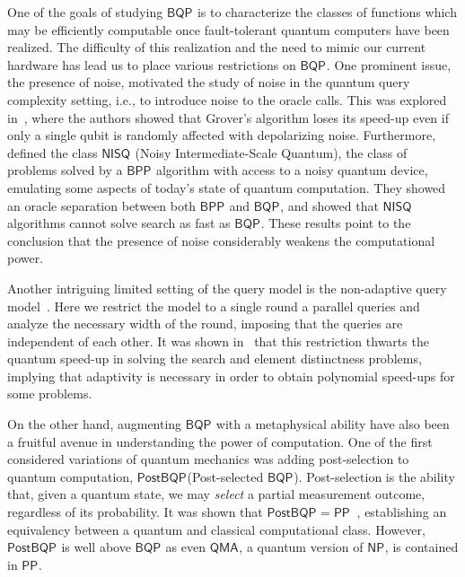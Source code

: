 \documentclass[10pt,a4paper]{article}
\newcommand{\compclass}[2][]{\ensuremath{\mathsf{#2}^{#1}}\xspace}
\newcommand{\bqpname}[0]{\compclass{BQP}}
\newcommand{\postbqpname}[0]{\compclass{PostBQP}}
\begin{document}
One of the goals of studying \bqpname is to characterize the classes of functions which may be efficiently computable once fault-tolerant quantum computers have been realized. The difficulty of this realization and the need to mimic our current hardware has lead us to place various restrictions on \bqpname . One prominent issue, the presence of noise, motivated the study of noise in the quantum query complexity setting, i.e., to introduce noise to the oracle calls. This was explored in~\cite{ addendum_noisy_oracle_search}, where the authors showed that Grover's algorithm loses its speed-up even if only a single qubit is randomly affected with depolarizing noise. Furthermore,~\cite{nisq_computation} defined the class \compclass{NISQ} (Noisy Intermediate-Scale Quantum), the class of problems solved by a \compclass{BPP} algorithm with access to a noisy quantum device, emulating some aspects of today's state of quantum computation. They showed an oracle separation between both \compclass{BPP} and \bqpname, and showed that \compclass{NISQ} algorithms cannot solve search as fast as \bqpname. 
These results point to the conclusion that the presence of noise considerably weakens the computational power. 


Another intriguing limited setting of the query model is the non-adaptive query model~\cite{nonadaptive_weighted_adversary}. Here we restrict the model to a single round a parallel queries and analyze the necessary width of the round, imposing that the queries are independent of each other. It was shown in~\cite{nonadaptive_weighted_adversary} that this restriction thwarts the quantum speed-up in solving the search and element distinctness problems, implying that adaptivity is necessary in order to obtain polynomial speed-ups for some problems.

 
 On the other hand, augmenting \bqpname with a metaphysical ability have also been a fruitful avenue in understanding the power of computation. 
 One of the first considered variations of quantum mechanics was adding post-selection to quantum computation, \postbqpname (Post-selected \bqpname). Post-selection is the ability that, given a quantum state, we may \emph{select} a partial measurement outcome, regardless of its probability. It was shown that $\postbqpname=\compclass{PP}$~\cite{pp_postbqp}, establishing an equivalency between a quantum and classical computational class. However, \postbqpname is well above \bqpname as even \compclass{QMA}, a quantum version of \compclass{NP}, is contained in \compclass{PP}.
\end{document}
